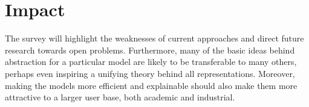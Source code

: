 \documentclass[11pt,english,twocolumn]{article}
\begin{document}

\section{Impact}
The survey will highlight the weaknesses of current approaches and direct future
research towards open problems. Furthermore, many of the basic ideas behind
abstraction for a particular model are likely to be transferable to many others,
perhaps even inspiring a unifying theory behind all representations. Moreover,
making the models more efficient and explainable should also make them more
attractive to a larger user base, both academic and industrial.

\let\oldbibliography\thebibliography
\renewcommand{\thebibliography}[1]{\oldbibliography{#1}
\setlength{\itemsep}{-3pt}}


{
\scriptsize

}
\end{document}
